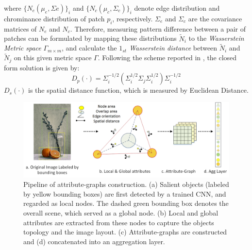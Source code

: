 \documentclass[10pt,twocolumn,letterpaper]{article}
\begin{document}
where ${\{ {N_e}({\mu _e},{\Sigma e})\} _i}$ and ${\{ {N_c}({\mu _c},{\Sigma _c})\} _i}$ denote edge distribution and chrominance distribution of patch $p_i$, respectively. ${\Sigma _e}$ and ${\Sigma _c}$ are the covariance matrices of $N_e$ and $N_c$. Therefore, measuring pattern difference between a pair of patches can be formulated by mapping these distributions $\tilde N_i$ to the \textit{Wasserstein Metric space} ${\Gamma _{m \times m}}$,  and calculate the \textit{$1_{st}$ Wasserstein distance} between ${\tilde N_i}$ and ${\tilde N_j}$ on this given metric space $\Gamma$.
Following the scheme reported in \cite{F.Pitie:2007:color_transfer}, the closed form solution is given by: 
\begin{equation}
{D_p}( \cdot ) = \Sigma _i^{ - 1/2}\left( {\Sigma _i^{1/2}{\Sigma _j}\Sigma _i^{1/2}} \right)\Sigma _i^{ - 1/2}
\end{equation}
${D_s}( \cdot )$ is the spatial distance function, which is measured by Euclidean Distance.

\begin{figure}
	\centering
	\includegraphics[scale=0.4]{figures/layout_graph.jpg}
	\caption{Pipeline of attribute-graphs construction. (a) Salient objects (labeled by yellow bounding boxes) are first detected by a trained CNN, and regarded as local nodes. The dashed green bounding box denotes the overall scene, which served as a global node. (b) Local and global attributes are extracted from these nodes to capture the objects topology and the image layout. (c) Attribute-graphs are constructed and (d) concatenated into an aggregation layer.}
	\label{layout}
	\vspace{-3mm}
\end{figure}
\end{document}
